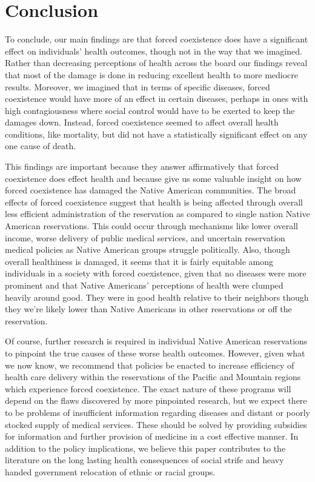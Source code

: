 \documentclass[12pt]{article}
\begin{document}
\section{Conclusion}
To conclude, our main findings are that forced coexistence does have a significant effect on individuals’ health outcomes, though not in the way that we imagined.  
Rather than decreasing perceptions of health across the board our findings reveal that most of the damage is done in reducing excellent health to more mediocre results.  
Moreover, we imagined that in terms of specific diseases, forced coexistence would have more of an effect in certain diseases, perhaps in ones with high contagiousness where social control would have to be exerted to keep the damages down.  
Instead, forced coexistence seemed to affect overall health conditions, like mortality, but did not have a statistically significant effect on any one cause of death.

This findings are important because they answer affirmatively that forced coexistence does effect health and because give us some valuable insight on how forced coexistence has damaged the Native American communities. 
The broad effects of forced coexistence suggest that health is being affected through overall less efficient administration of the reservation as compared to single nation Native American reservations.  
This could occur through mechanisms like lower overall income, worse delivery of public medical services, and uncertain reservation medical policies as Native American groups struggle politically. 
Also, though overall healthiness is damaged, it seems that it is fairly equitable among individuals in a society with forced coexistence, given that no diseases were more prominent and that Native Americans’ perceptions of health were clumped heavily around good. 
They were in good health relative to their neighbors though they we’re likely lower than Native Americans in other reservations or off the reservation.  

Of course, further research is required in individual Native American reservations to pinpoint the true causes of these worse health outcomes. 
However, given what we now know, we recommend that policies be enacted to increase efficiency of health care delivery within the reservations of the Pacific and Mountain regions which experience forced coexistence. 
The exact nature of these programs will depend on the flaws discovered by more pinpointed research, but we expect there to be problems of insufficient information regarding diseases and distant or poorly stocked supply of medical services. 
These should be solved by providing subsidies for information and further provision of medicine in a cost effective manner. 
In addition to the policy implications, we believe this paper contributes to the literature on the long lasting health consequences of social strife and heavy handed government relocation of ethnic or racial groups.


\newpage


\end{document}
